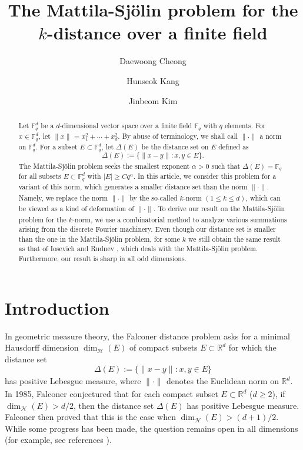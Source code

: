 \documentclass[a4paper,11pt]{amsart}
\title{The Mattila-Sj\"{o}lin problem for the $k$-distance over a finite field}
\author{Daewoong Cheong}
\author{Hunseok Kang}
\author{Jinbeom Kim}
\numberwithin{equation}{section}
\def\bR{\mathbb{R}}
\def\Fq#1{\mathbb{F}_q^{#1}}
\def\knorm#1#2{\lVert#2\rVert_{#1}}
\begin{document}
\begin{abstract}
Let $\Fq{d}$ be a $d$-dimensional vector space over a finite field $\Fq{}$ with $q$ elements. For $x\in \Fq{d}$, let $\knorm{}{x} = x_1^2+\cdots +x_d^2$. By abuse of terminology, we shall call $\knorm{}{\cdot}$ a norm on $\Fq{d}$. For a subset $E\subset \Fq{d}$, let $\Delta(E)$ be the distance set on $E$ defined as \[\Delta(E):=\{\knorm{}{x-y} : x, y \in E \}.\]  The Mattila-Sj\"{o}lin problem seeks the smallest exponent $\alpha>0$ such that  $ \Delta(E) =\Fq{}$ for all subsets $E \subset \Fq{d}$ with $|E| \geq Cq^\alpha$.
 In this article, we consider this problem for a variant of this norm, which generates a smaller distance set  than the norm $\knorm{}{\cdot}.$   Namely,  we replace the norm $\knorm{}{\cdot}$ by the so-called $k$-norm  $(1 \leq k \leq d)$, which can be viewed as a kind of deformation of $\knorm{}{\cdot}$. To derive our  result on the Mattila-Sj\"{o}lin problem for the $k$-norm, we use a combinatorial method to analyze various summations arising from the discrete Fourier machinery. Even though our distance set is smaller than the one in the  Mattila-Sj\"{o}lin problem, for some $k$ we still obtain the same result as that of Iosevich and Rudnev \cite{IR07}, which deals with the Mattila-Sj\"{o}lin problem. Furthermore, our result is sharp in all odd dimensions.
\end{abstract}


\maketitle

\section{Introduction}
In geometric measure theory, the Falconer distance problem asks for a minimal Hausdorff dimension $\dim_{\mathcal{H}}(E)$ of compact subsets $E \subset \mathbb{R}^d $ for which  the distance set  
\[
\Delta(E) := \{ \knorm{}{x-y} : x, y \in E \}
\]  
has positive Lebesgue measure, where $\knorm{}{\cdot}$ denotes the Euclidean norm on $\bR^d$. In 1985, Falconer \cite{Fa85} conjectured that  for each  compact subset $ E \subset \mathbb{R}^d $ ($ d \geq 2 $),  if  $\dim_{\mathcal{H}}(E) > d/2$, then the distance set $\Delta(E)$ has positive Lebesgue measure. Falconer then proved that this is the case  when $ \dim_{\mathcal{H}}(E) > (d+1)/2 $. While some progress has been made, the question remains open in all dimensions (for example, see references \cite{Bo94, Wo99, Er05, DGOWWZ18, GIOW19, DZ19, DIOWZ21, DORZ23}).
\end{document}
